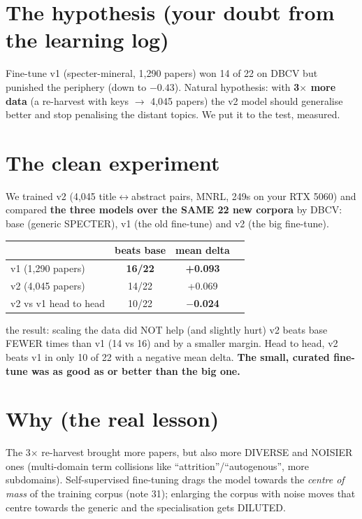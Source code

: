 \documentclass[11pt,a4paper]{article}
\begin{document}
\section{The hypothesis (your doubt from the learning log)}

Fine-tune v1 (specter-mineral, 1,290 papers) won 14 of 22 on DBCV but punished the periphery
(down to $-0.43$). Natural hypothesis: with \textbf{3$\times$ more data} (a re-harvest with
keys $\to$ 4,045 papers) the v2 model should generalise better and stop penalising the distant
topics. We put it to the test, measured.

\section{The clean experiment}

We trained v2 (4,045 title$\leftrightarrow$abstract pairs, MNRL, 249s on your RTX 5060) and
compared \textbf{the three models over the SAME 22 new corpora} by DBCV: base (generic
SPECTER), v1 (the old fine-tune) and v2 (the big fine-tune).

\begin{center}
\begin{tabular}{lccc}
 & beats base & mean delta \\
\hline
v1 (1,290 papers) & \textbf{16/22} & \textbf{+0.093} \\
v2 (4,045 papers) & 14/22 & +0.069 \\
v2 vs v1 head to head & 10/22 & \textbf{$-$0.024} \\
\end{tabular}
\end{center}

\begin{concepto}{the result: scaling the data did NOT help (and slightly hurt)}
v2 beats base FEWER times than v1 (14 vs 16) and by a smaller margin. Head to head, v2 beats v1
in only 10 of 22 with a negative mean delta. \textbf{The small, curated fine-tune was as good
as or better than the big one.}
\end{concepto}

\section{Why (the real lesson)}

The 3$\times$ re-harvest brought more papers, but also more DIVERSE and NOISIER ones
(multi-domain term collisions like ``attrition''/``autogenous'', more subdomains).
Self-supervised fine-tuning drags the model towards the \emph{centre of mass} of the training
corpus (note 31); enlarging the corpus with noise moves that centre towards the generic and the
specialisation gets DILUTED.
\end{document}
